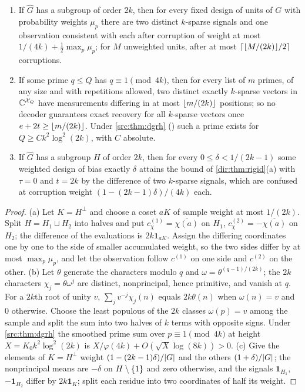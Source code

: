 \begin{theorem}\label{dir:thm:codeobstruction}
\begin{enumerate}[label=\textup{(\alph*)}]
\item If $\widehat G$ has a subgroup of order $2k$, then for every fixed design of units of $G$ with
probability weights $\mu_p$ there are two distinct $k$-sparse signals and one observation consistent with
each after corruption of weight at most $1/(4k)+\frac12\max_p\mu_p$; for $M$ unweighted units, after at most
$\lceil\lfloor M/(2k)\rfloor/2\rceil$ corruptions.
\item If some prime $q\le Q$ has $q\equiv1\pmod{4k}$, then for every list of $m$ primes, of any size and with
repetitions allowed, two distinct exactly $k$-sparse vectors in $\mathbb{C}^{\mathcal X_Q}$ have measurements
differing in at most $\lfloor m/(2k)\rfloor$ positions; so no decoder guarantees exact recovery for all $k$-sparse
vectors once $e+2t\ge\lfloor m/(2k)\rfloor$. Under \cref{src:thm:dgrh} \textup{(\stG)} such a prime exists for
$Q\ge Ck^2\log^2(2k)$, with $C$ absolute.
\item If $\widehat G$ has a subgroup $H$ of order $2k$, then for every $0\le\delta<1/(2k-1)$ some weighted design
of bias exactly $\delta$ attains the bound of \cref{dir:thm:rigid}(a) with $\tau=0$ and $t=2k$ by the difference
of two $k$-sparse signals, which are confused at corruption weight $(1-(2k-1)\delta)/(4k)$ each.
\end{enumerate}
\end{theorem}

\begin{proof}
(a) Let $K=H^\perp$ and choose a coset $aK$ of sample weight at most $1/(2k)$. Split $H=H_1\sqcup H_2$ into
halves and put $c^{(1)}_\chi=\overline{\chi(a)}$ on $H_1$, $c^{(2)}_\chi=-\overline{\chi(a)}$ on $H_2$; the difference of
the evaluations is $2k\mathbf 1_{aK}$. Assign the differing coordinates one by one to the side of smaller
accumulated weight, so the two sides differ by at most $\max_p\mu_p$, and let the observation follow
$c^{(1)}$ on one side and $c^{(2)}$ on the other. (b) Let $\theta$ generate the characters modulo $q$ and
$\omega=\theta^{(q-1)/(2k)}$; the $2k$ characters $\chi_j=\theta\omega^j$ are distinct, nonprincipal, hence
primitive, and vanish at $q$. For a $2k$th root of unity $v$, $\sum_jv^{-j}\chi_j(n)$ equals $2k\theta(n)$ when
$\omega(n)=v$ and $0$ otherwise. Choose the least populous of the $2k$ classes $\omega(p)=v$ among the
sample and split the sum into two halves of $k$ terms with opposite signs. Under \cref{src:thm:dgrh}
the smoothed prime sum over $p\equiv1\pmod{4k}$ at height $X=K_0k^2\log^2(2k)$ is
$X/\varphi(4k)+O(\sqrt X\log(8k))>0$. (c) Give the elements of $K=H^\perp$ weight $(1-(2k-1)\delta)/\lvert G\rvert$ and
the others $(1+\delta)/\lvert G\rvert$; the nonprincipal means are $-\delta$ on $H\setminus\{1\}$ and zero
otherwise, and the signals $\mathbf 1_{H_1}$, $-\mathbf 1_{H_2}$ differ by $2k\mathbf 1_K$; split each residue
into two coordinates of half its weight.
\end{proof}

